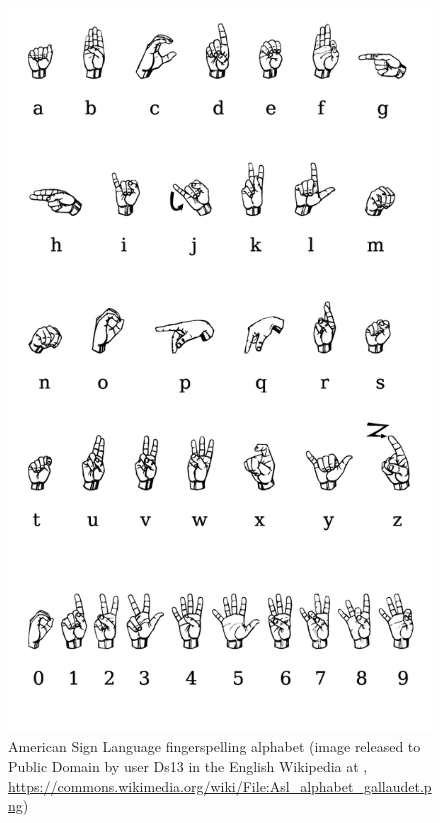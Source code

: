 \documentclass[output=paper
                ,modfonts
                ,nonflat
	        ,collection
	        ,collectionchapter
	        ,collectiontoclongg
 	        ,biblatex
                ,babelshorthands
                ,newtxmath
                ,draftmode
                ,colorlinks, citecolor=brown
]{./langsci/langscibook}
\begin{document}
\begin{figure}[tb]
  \centering
  \includegraphics[width=0.5\linewidth]{figures/Asl-alphabet-gallaudet.png}
  \caption[ASL fingerspelling]{American Sign Language fingerspelling alphabet (image released to Public Domain by user Ds13 in the English Wikipedia at , \url{https://commons.wikimedia.org/wiki/File:Asl_alphabet_gallaudet.png})}
  \label{fig:asl}
\end{figure}
\end{document}
